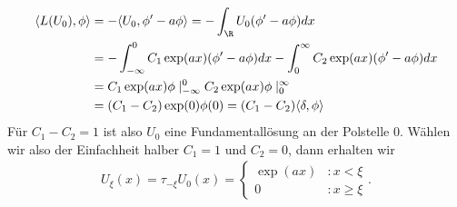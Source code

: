 \begin{solution}
\begin{enumerate}[label = (\roman*)]
  \begin{align*}
    \langle L(U_0), \phi \rangle
    &= -\langle U_0, \phi^{\prime} - a\phi \rangle
  = -\int_{\R}U_0(\phi^{\prime} - a\phi)dx \\
  &= -\int_{-\infty}^0C_1\exp(ax)(\phi^{\prime} - a\phi)dx
  -\int_0^{\infty}C_2\exp(ax)(\phi^{\prime} - a\phi)dx \\
  &= C_1\exp(ax)\phi\mid_{-\infty}^0  C_2\exp(ax)\phi\mid_{0}^{\infty}\\
  &= (C_1-C_2)\exp(0)\phi(0) = (C_1 - C_2)\langle \delta, \phi \rangle
  \end{align*}
  Für $C_1 - C_2 = 1$ ist also $U_0$ eine Fundamentallösung
  an der Polstelle $0$. Wählen wir also der Einfachheit halber $C_1 = 1$ und $C_2 = 0$, dann erhalten wir
  \begin{align*}
    U_{\xi}(x) = \tau_{-\xi}U_0(x) =
    \begin{cases}
      \exp(ax) &: x < \xi \\
      0 &: x \geq \xi
    \end{cases}.
  \end{align*}
\end{enumerate}


\end{solution}

